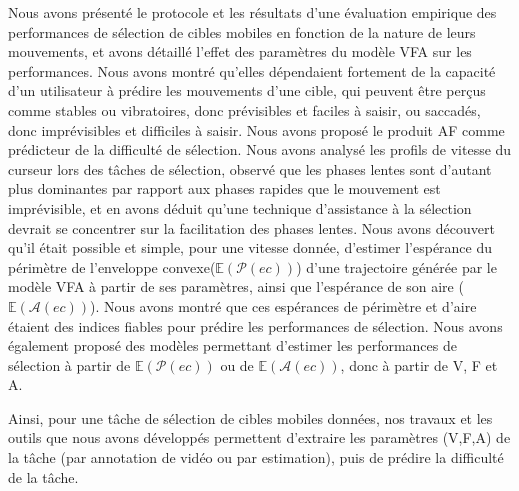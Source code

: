 	Nous avons présenté le protocole et les résultats d'une évaluation empirique des performances de sélection de cibles mobiles en fonction de la nature de leurs mouvements, et avons détaillé l'effet des paramètres du modèle VFA sur les performances. Nous avons montré qu'elles dépendaient fortement de la capacité d'un utilisateur à prédire les mouvements d'une cible, qui peuvent être perçus comme stables ou vibratoires, donc prévisibles et faciles à saisir, ou saccadés, donc imprévisibles et difficiles à saisir. Nous avons proposé le produit AF comme prédicteur de la difficulté de sélection. Nous avons analysé les profils de vitesse du curseur lors des tâches de sélection, observé que les phases lentes sont d'autant plus dominantes par rapport aux phases rapides que le mouvement est imprévisible, et en avons déduit qu'une technique d'assistance à la sélection devrait se concentrer sur la facilitation des phases lentes. Nous avons découvert qu'il était possible et simple, pour une vitesse donnée, d'estimer l'espérance du périmètre de l'enveloppe convexe($\mathbb{E}(\mathcal{P}(ec))$) d'une trajectoire générée par le modèle VFA à partir de ses paramètres, ainsi que l'espérance de son aire ($\mathbb{E}(\mathcal{A}(ec))$). Nous avons montré que ces espérances de périmètre et d'aire étaient des indices fiables pour prédire les performances de sélection. Nous avons également proposé des modèles permettant d'estimer les performances de sélection à partir de $\mathbb{E}(\mathcal{P}(ec))$ ou de $\mathbb{E}(\mathcal{A}(ec))$, donc à partir de V, F et A.
	
	Ainsi, pour une tâche de sélection de cibles mobiles données, nos travaux et les outils que nous avons développés permettent d'extraire les paramètres (V,F,A) de la tâche (par annotation de vidéo ou par estimation), puis de prédire la difficulté de la tâche.
	
